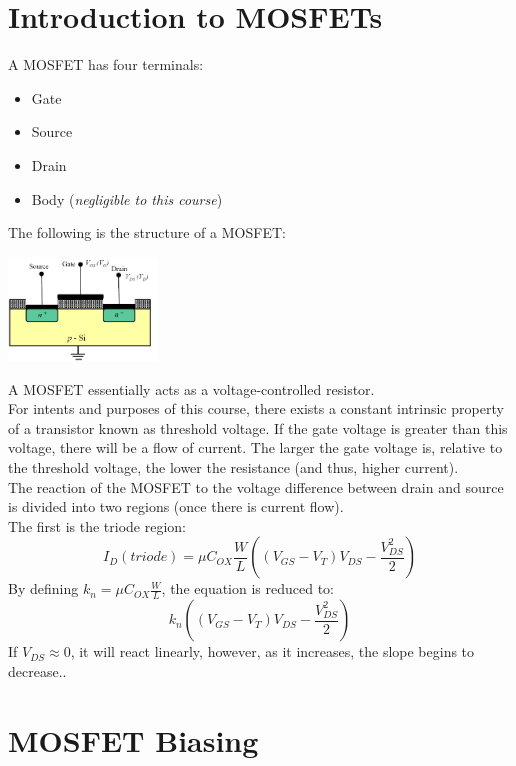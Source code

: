 \documentclass[nobib]{tufte-handout}
\begin{document}
\section{Introduction to MOSFETs}
A MOSFET has four terminals:
\begin{itemize}
    \item Gate
    \item Source
    \item Drain
    \item Body (\textit{negligible to this course})
\end{itemize}
The following is the structure of a MOSFET:
\begin{center}
    \includegraphics[width = 150px]{images/MOSFET_struct.png}
\end{center}
A MOSFET essentially acts as a voltage-controlled resistor.\\
For intents and purposes of this course, there exists a constant intrinsic property of a transistor known as threshold voltage. If the gate voltage is greater than this voltage, there will be a flow of current. The larger the gate voltage is, relative to the threshold voltage, the lower the resistance (and thus, higher current).\\
The reaction of the MOSFET to the voltage difference between drain and source is divided into two regions (once there is current flow).\\
The first is the triode region:
\begin{equation*}
    I_D(triode) = \mu C_{OX}\frac{W}{L}\left((V_{GS}-V_T)V_{DS}-\frac{V_{DS}^2}{2}\right)
\end{equation*}
By defining $k_n = \mu C_{OX}\frac{W}{L}$, the equation is reduced to:
\begin{equation*}
    k_n\left((V_{GS}-V_T)V_{DS}-\frac{V_{DS}^2}{2}\right)
\end{equation*}
If $V_{DS}\approx 0$, it will react linearly, however, as it increases, the slope begins to decrease..
\section{MOSFET Biasing}
\end{document}
